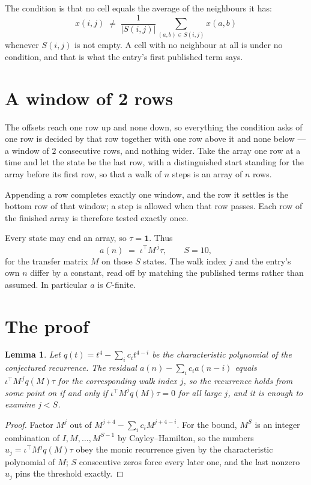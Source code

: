 \documentclass[11pt,a4paper]{article}
\theoremstyle{plain}
\newtheorem{lemma}[theorem]{Lemma}
\theoremstyle{definition}
\begin{document}
The condition is that no cell equals the average of the neighbours it has:
\[
x(i,j)\;\neq\;\frac{1}{|S(i,j)|}\sum_{(a,b)\in S(i,j)}x(a,b)
\]
whenever $S(i,j)$ is not empty. A cell with no neighbour at all is under no condition, and that is what the entry's first published term says.

\section{A window of 2 rows}

The offsets reach one row up and none down, so everything the condition asks of one row is
decided by that row together with one row above it and none below --- a window of
$2$ consecutive rows, and nothing wider. Take the array one row at a time
and let the state be the last row, with a distinguished start standing for the
array before its first row, so that a walk of $n$ steps is an array of $n$ rows.

Appending a row completes exactly one window, and the row it settles is the bottom row of that window; a step is
allowed when that row passes. Each row of the finished
array is therefore tested exactly once.

Every state may end an array, so $\tau=\mathbf{1}$.
Thus
\[
a(n)\;=\;\iota^{\!\top}M^{\,j}\tau ,\qquad S=10,
\]
for the transfer matrix $M$ on those $S$ states. The walk index $j$ and the entry's own $n$
differ by a constant, read off by matching the published terms rather than assumed. In
particular $a$ is $C$-finite.

\section{The proof}

\begin{lemma}\label{lem:crit}
Let $q(t)=t^{4}-\sum_i c_it^{4-i}$ be the characteristic polynomial of the
conjectured recurrence. The residual $a(n)-\sum_ic_ia(n-i)$ equals
$\iota^{\!\top}M^{\,j}q(M)\tau$ for the corresponding walk index $j$, so the recurrence
holds from some point on if and only if $\iota^{\!\top}M^{j}q(M)\tau=0$ for all large $j$,
and it is enough to examine $j<S$.
\end{lemma}

\begin{proof}
Factor $M^{j}$ out of $M^{j+4}-\sum_ic_iM^{j+4-i}$. For the bound, $M^{S}$
is an integer combination of $I,M,\dots,M^{S-1}$ by Cayley--Hamilton, so the numbers
$u_j=\iota^{\!\top}M^{j}q(M)\tau$ obey the monic recurrence given by the characteristic
polynomial of $M$; $S$ consecutive zeros force every later one, and the last nonzero $u_j$
pins the threshold exactly.
\end{proof}
\end{document}
